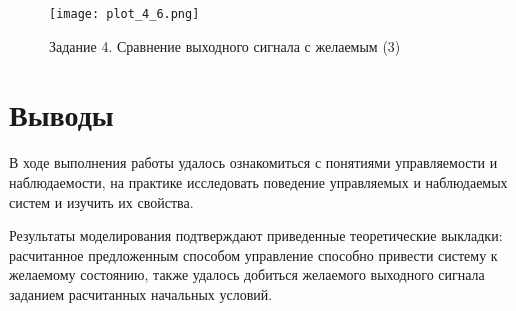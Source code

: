 \begin{figure}[]
    \centering
    \texttt{[image: plot\_4\_6.png]}
    \caption{\label{fig:The-caption-1}Задание 4. Сравнение выходного сигнала с желаемым (3)}
\end{figure}

\pagebreak

\section{Выводы}
В ходе выполнения работы удалось ознакомиться с понятиями управляемости и наблюдаемости, на практике исследовать
поведение управляемых и наблюдаемых систем и изучить их свойства.

Результаты моделирования подтверждают приведенные теоретические выкладки: расчитанное предложенным способом 
управление способно привести систему к желаемому состоянию, также удалось добиться желаемого выходного
сигнала заданием расчитанных начальных условий.